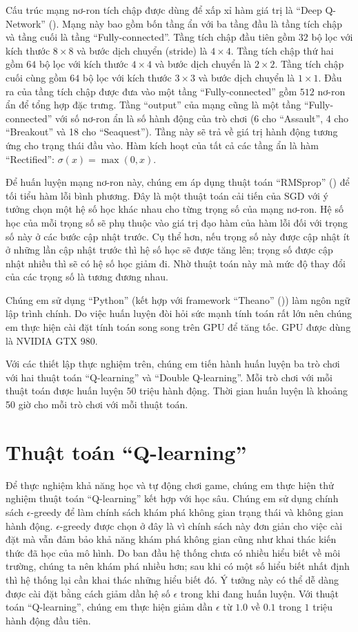 	Cấu trúc mạng nơ-ron tích chập được dùng để xấp xỉ hàm giá trị là ``Deep Q-Network'' (\cite{mnihdqn2015}).
	Mạng này bao gồm bốn tầng ẩn với ba tầng đầu là tầng tích chập và tầng cuối là tầng ``Fully-connected''.
	Tầng tích chập đầu tiên gồm $32$ bộ lọc với kích thước $8\times8$ và bước dịch chuyển (stride) là $4\times4$.
	Tầng tích chập thứ hai gồm $64$ bộ lọc với kích thước $4\times4$ và bước dịch chuyển là $2\times2$.
	Tầng tích chập cuối cùng gồm $64$ bộ lọc với kích thước $3\times3$ và bước dịch chuyển là $1\times1$.
	Đầu ra của tầng tích chập được đưa vào một tầng ``Fully-connected'' gồm $512$ nơ-ron ẩn để tổng hợp đặc trưng.
	Tầng ``output'' của mạng cũng là một tầng ``Fully-connected'' với số nơ-ron ẩn là số hành động của trò chơi (6 cho ``Assault'', 4 cho ``Breakout'' và 18 cho ``Seaquest'').
	Tầng này sẽ trả về giá trị hành động tương ứng cho trạng thái đầu vào.
	Hàm kích hoạt của tất cả các tầng ẩn là hàm ``Rectified'': $\sigma(x) = \max(0, x)$.
	
	Để huấn luyện mạng nơ-ron này, chúng em áp dụng thuật toán ``RMSprop'' (\cite{tieleman2012lecture}) để tối tiểu hàm lỗi bình phương.
	Đây là một thuật toán cải tiến của SGD với ý tưởng chọn một hệ số học khác nhau cho từng trọng số của mạng nơ-ron.
	Hệ số học của mỗi trọng số sẽ phụ thuộc vào giá trị đạo hàm của hàm lỗi đối với trọng số này ở các bước cập nhật trước.
	Cụ thể hơn, nếu trọng số này được cập nhật ít ở những lần cập nhật trước thì hệ số học sẽ được tăng lên; trọng số được cập nhật nhiều thì sẽ có hệ số học giảm đi.
	Nhờ thuật toán này mà mức độ thay đổi của các trọng số là tương đương nhau.
	
	Chúng em sử dụng ``Python'' (kết hợp với framework ``Theano'' (\cite{2016arXiv160502688short})) làm ngôn ngữ lập trình chính.
	Do việc huấn luyện đòi hỏi sức mạnh tính toán rất lớn nên chúng em thực hiện cài đặt tính toán song song trên GPU để tăng tốc.
	GPU được dùng là NVIDIA GTX 980.
	
	Với các thiết lập thực nghiệm trên, chúng em tiến hành huấn luyện ba trò chơi với hai thuật toán ``Q-learning'' và ``Double Q-learning''.
	Mỗi trò chơi với mỗi thuật toán được huấn luyện $50$ triệu hành động.
	Thời gian huấn luyện là khoảng 50 giờ cho mỗi trò chơi với mỗi thuật toán.
	
\section{Thuật toán ``Q-learning''}
	Để thực nghiệm khả năng học và tự động chơi game, chúng em thực hiện thử nghiệm thuật toán ``Q-learning'' kết hợp với học sâu.
	Chúng em sử dụng chính sách $\epsilon$-greedy để làm chính sách khám phá không gian trạng thái và không gian hành động.
	$\epsilon$-greedy được chọn ở đây là vì chính sách này đơn giản cho việc cài đặt mà vẫn đảm bảo khả năng khám phá không gian cũng như khai thác kiến thức đã học của mô hình.
	Do ban đầu hệ thống chưa có nhiều hiểu biết về môi trường, chúng ta nên khám phá nhiều hơn; sau khi có một số hiểu biết nhất định thì hệ thống lại cần khai thác những hiểu biết đó.
	Ý tưởng này có thể dễ dàng được cài đặt bằng cách giảm dần hệ số $\epsilon$ trong khi đang huấn luyện.
	Với thuật toán ``Q-learning'', chúng em thực hiện giảm dần $\epsilon$ từ $1.0$ về $0.1$ trong $1$ triệu hành động đầu tiên.
	
